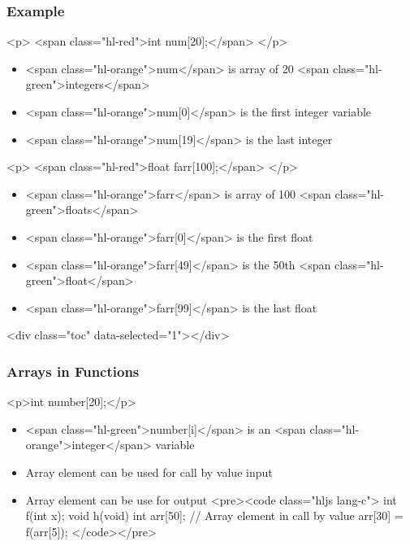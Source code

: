 \documentclass{../c-lecture}
\begin{document}
\begin{frame}
  \frametitle{Example}
  <p>
    <span class="hl-red">int num[20];</span>
  </p>
  \begin{itemize}
    \item
      <span class="hl-orange">num</span> is array of 20
      <span class="hl-green">integers</span>

    \item <span class="hl-orange">num[0]</span> is the first integer variable
    \item <span class="hl-orange">num[19]</span> is the last integer
  \end{itemize}
  <p>
    <span class="hl-red">float farr[100];</span>
  </p>
  \begin{itemize}
    \item
      <span class="hl-orange">farr</span> is array of 100
      <span class="hl-green">floats</span>

    \item <span class="hl-orange">farr[0]</span> is the first float
    \item
      <span class="hl-orange">farr[49]</span> is the 50th
      <span class="hl-green">float</span>

    \item <span class="hl-orange">farr[99]</span> is the last float
  \end{itemize}
\end{frame}
\begin{frame}
  <div class="toc" data-selected="1"></div>
\end{frame}
\begin{frame}
  \frametitle{Arrays in Functions}
  <p>int number[20];</p>
  \begin{itemize}
    \item
      <span class="hl-green">number[i]</span> is an
      <span class="hl-orange">integer</span> variable

    \item Array element can be used for call by value input
    \item Array element can be use for output
    <pre><code class="hljs lang-c">
int f(int x);
void h(void) {
  int arr[50];
  // Array element in call by value arr[30] = f(arr[5]);
}
    </code></pre>
  \end{itemize}
\end{frame}
\end{document}
